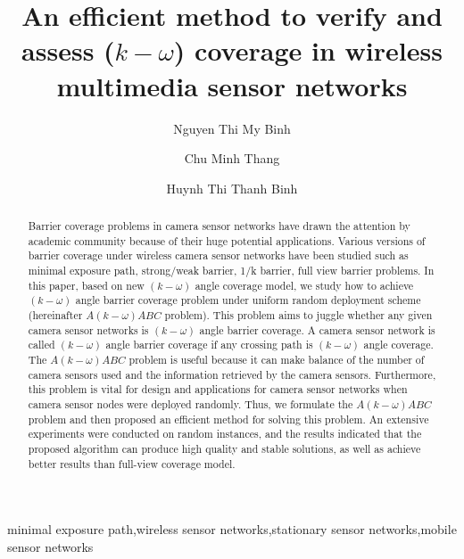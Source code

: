 \documentclass[3p]{elsarticle}
\begin{document}
\begin{frontmatter}

\title{An efficient method to verify and assess ($k-\omega$) coverage in wireless multimedia sensor networks}

\author[1]{Nguyen Thi My Binh}
\author[2]{Chu Minh Thang}
\author[3]{Huynh Thi Thanh Binh}

\begin{abstract}
Barrier coverage problems in camera sensor networks have drawn the attention by academic community because of their huge potential applications. Various versions of barrier coverage under wireless camera sensor networks have been studied such as minimal exposure path, strong/weak barrier, 1/k barrier, full view barrier problems. In this paper, based on new $(k-\omega)$ angle coverage model, we study how to achieve $(k-\omega)$ angle barrier coverage problem under uniform random deployment scheme (hereinafter $A(k-\omega)ABC$ problem). This problem aims to juggle whether any given camera sensor networks is $(k-\omega)$ angle barrier coverage. A camera sensor network is called $(k-\omega)$ angle barrier coverage if any crossing path is $(k-\omega)$ angle coverage. The $A(k-\omega)ABC$ problem is useful because it can make balance of the number of camera sensors used and the information retrieved by the camera sensors. Furthermore, this problem is vital for design and applications for camera sensor networks when camera sensor nodes were deployed randomly. Thus, we formulate the $A(k-\omega)ABC$ problem and then proposed an efficient method for solving this problem. An extensive experiments were conducted on random instances, and the results indicated that the proposed algorithm can produce high quality and stable solutions, as well as achieve better results than full-view coverage model.
\end{abstract}

\begin{keyword}
minimal exposure path\sep wireless sensor networks\sep stationary sensor networks\sep mobile sensor networks
\end{keyword}

\end{frontmatter}

\end{document}
